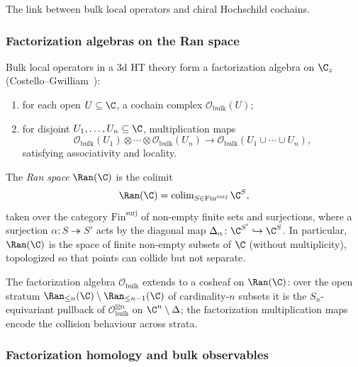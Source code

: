 The link between bulk local operators and chiral Hochschild cochains.

\subsubsection{Factorization algebras on the Ran space}

Bulk local operators in a 3d HT theory form a factorization algebra on $\C_z$ (Costello--Gwilliam~\cite{CG17}):

\begin{enumerate}[label=(\roman*)]
\item for each open $U \subseteq \C$, a cochain complex $\mathcal{O}_{\text{bulk}}(U)$;
\item for disjoint $U_1, \ldots, U_n \subseteq \C$, multiplication maps
\begin{equation}
\mathcal{O}_{\text{bulk}}(U_1) \otimes \cdots \otimes \mathcal{O}_{\text{bulk}}(U_n) \longrightarrow \mathcal{O}_{\text{bulk}}(U_1 \cup \cdots \cup U_n),
\end{equation}
satisfying associativity and locality.
\end{enumerate}

\begin{definition}
\label{def:Ran_space}
The \emph{Ran space} $\Ran(\C)$ is the colimit
\begin{equation}
\Ran(\C) = \operatorname{colim}_{S \in \mathrm{Fin}^{\mathrm{surj}}} \C^S,
\end{equation}
taken over the category $\mathrm{Fin}^{\mathrm{surj}}$ of non-empty finite sets and surjections, where a surjection $\alpha\colon S\twoheadrightarrow S'$ acts by the diagonal map $\Delta_\alpha\colon \C^{S'}\hookrightarrow \C^{S}$. In particular, $\Ran(\C)$ is the space of finite non-empty subsets of $\C$ (without multiplicity), topologized so that points can collide but not separate.
\end{definition}

The factorization algebra $\mathcal{O}_{\text{bulk}}$ extends to a cosheaf on $\Ran(\C)$: over the open stratum $\Ran_{\leq n}(\C) \setminus \Ran_{\leq n-1}(\C)$ of cardinality-$n$ subsets it is the $S_n$-equivariant pullback of $\mathcal{O}_{\text{bulk}}^{\boxtimes n}$ on $\C^n \setminus \Delta$; the factorization multiplication maps encode the collision behaviour across strata.

\subsubsection{Factorization homology and bulk observables}

